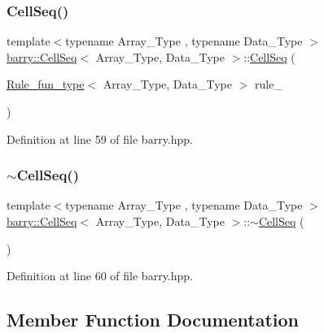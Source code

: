 \subsubsection{\texorpdfstring{Cell\+Seq()}{CellSeq()}\hspace{0.1cm}{\footnotesize\ttfamily [2/2]}}
{\footnotesize\ttfamily template$<$typename Array\+\_\+\+Type , typename Data\+\_\+\+Type $>$ \\
\hyperlink{classbarry_1_1_cell_seq}{barry\+::\+Cell\+Seq}$<$ Array\+\_\+\+Type, Data\+\_\+\+Type $>$\+::\hyperlink{classbarry_1_1_cell_seq}{Cell\+Seq} (\begin{DoxyParamCaption}\item[{\hyperlink{namespacebarry_aefd7e6d4ba228e2ce1074d075c512178}{Rule\+\_\+fun\+\_\+type}$<$ Array\+\_\+\+Type, Data\+\_\+\+Type $>$}]{rule\+\_\+ }\end{DoxyParamCaption})\hspace{0.3cm}{\ttfamily [inline]}}



Definition at line 59 of file barry.\+hpp.

\mbox{\label{classbarry_1_1_cell_seq_a8cb52b7bdcc9181df159a049c60d04f9}} 
\subsubsection{\texorpdfstring{$\sim$\+Cell\+Seq()}{~CellSeq()}}
{\footnotesize\ttfamily template$<$typename Array\+\_\+\+Type , typename Data\+\_\+\+Type $>$ \\
\hyperlink{classbarry_1_1_cell_seq}{barry\+::\+Cell\+Seq}$<$ Array\+\_\+\+Type, Data\+\_\+\+Type $>$\+::$\sim$\hyperlink{classbarry_1_1_cell_seq}{Cell\+Seq} (\begin{DoxyParamCaption}{ }\end{DoxyParamCaption})\hspace{0.3cm}{\ttfamily [inline]}}



Definition at line 60 of file barry.\+hpp.



\subsection{Member Function Documentation}
\mbox{\label{classbarry_1_1_cell_seq_a844b28a2053fd2c6810340a5a9aef945}} 
